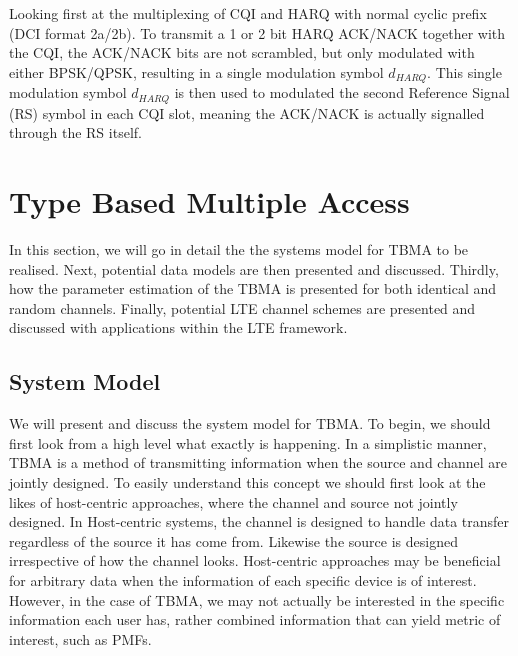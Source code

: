 \documentclass{article}
\begin{document}
Looking first at the multiplexing of CQI and HARQ with normal cyclic prefix (DCI format 2a/2b). To transmit a 1 or 2 bit HARQ ACK/NACK together with the CQI, the ACK/NACK bits are not scrambled, but only modulated with either BPSK/QPSK, resulting in a single modulation symbol $d_{HARQ}$.  This single modulation symbol $d_{HARQ}$ is then used to modulated the second Reference Signal (RS) symbol in each CQI slot, meaning the ACK/NACK is actually signalled through the RS itself.


\section{Type Based Multiple Access}\label{tbma_sec}
In this section, we will go in detail the the systems model for TBMA to be realised. Next, potential data models are then presented and discussed. Thirdly, how the parameter estimation of the TBMA is presented for both identical and random channels. Finally, potential LTE channel schemes are presented and discussed with applications within the LTE framework. 
\subsection{System Model}\label{sys_mod}
We will present and discuss the system model for TBMA. To begin, we should first look from a high level what exactly is happening. In a simplistic manner, TBMA is a method of transmitting information when the source and channel are jointly designed. To easily understand this concept we should first look at the likes of host-centric approaches, where the channel and source not jointly designed. In Host-centric systems, the channel is designed to handle data transfer regardless of the source it has come from. Likewise the source is designed irrespective of how the channel looks. Host-centric approaches may be beneficial for arbitrary data when the information of each specific device is of interest. However, in the case of TBMA, we may not actually be interested in the specific information each user has, rather combined information that can yield metric of interest, such as PMFs. 
\end{document}
